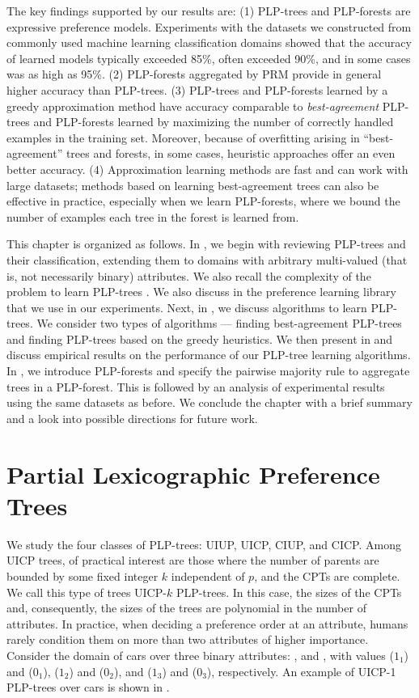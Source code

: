 The key findings supported by our results are: (1) PLP-trees and PLP-forests 
are expressive preference models. Experiments with the datasets we constructed 
from commonly used machine learning classification domains showed that the
accuracy of learned models typically exceeded 85\%, often exceeded 90\%, and 
in some cases was as high as 95\%. (2) PLP-forests aggregated by PRM provide 
in general higher accuracy than PLP-trees. (3) PLP-trees and PLP-forests 
learned by a greedy approximation method have accuracy comparable to 
\emph{best-agreement} PLP-trees and PLP-forests learned by maximizing the
number of correctly handled examples in the training set. Moreover, because of 
overfitting arising in ``best-agreement'' trees and forests, in some cases, heuristic 
approaches offer an even better accuracy. (4) Approximation learning methods 
are fast and can work with large datasets; methods based on learning 
best-agreement trees can also be effective in practice, especially when we 
learn PLP-forests, where we bound the number of examples each tree in the
forest is learned from.

This chapter is organized as follows. In , we begin with reviewing
PLP-trees and their classification, extending them to domains with arbitrary
multi-valued (that is, not necessarily binary) attributes. We also recall 
the complexity of the problem to learn PLP-trees \cite{conf/aaai15/LiuT}. 
We also discuss in  the preference learning library that we
use in our experiments. Next, in , we discuss algorithms to
learn PLP-trees. We consider two types of algorithms --- finding best-agreement
PLP-trees and finding PLP-trees based on the greedy heuristics. 
We then present in 
and discuss empirical results on the performance of our PLP-tree learning 
algorithms. In , we introduce PLP-forests and specify the
pairwise majority rule to aggregate trees in a PLP-forest. This is followed by 
an analysis of experimental results using the same datasets as before. We 
conclude the chapter with a brief summary and a look into possible 
directions for future work.


\section{Partial Lexicographic Preference Trees}
\label{sec:trees}
We study the four classes of PLP-trees: UIUP, UICP, CIUP, and CICP.
Among UICP trees, of practical interest are those where the number of
parents are bounded by some fixed integer $k$ independent of $p$, and 
the CPTs are complete. We call this type of trees UICP-$k$ PLP-trees.
In this case, the sizes of the CPTs and, consequently, the sizes of the trees 
are polynomial in the number of attributes.
In practice, when deciding a preference order at an attribute,
humans rarely condition them on more than two attributes of higher importance.
Consider the domain of cars over three binary attributes:
,  and ,
with values  ($1_1$) and  ($0_1$),
 ($1_2$) and  ($0_2$), and
 ($1_3$) and  ($0_3$), respectively.
An example of UICP-1 PLP-trees over cars is shown in .

